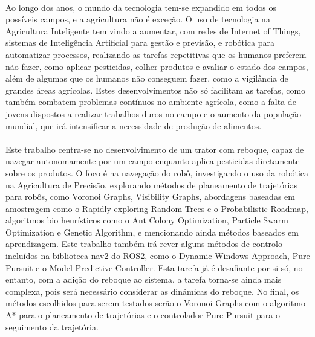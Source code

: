 
%

\paragraph{}Ao longo dos anos, o mundo da tecnologia tem-se expandido em todos os possíveis campos, 
e a agricultura não é exceção. O uso de tecnologia na Agricultura Inteligente tem vindo a aumentar, 
com redes de Internet of Things, sistemas de Inteligência Artificial para gestão e previsão, e robótica para 
automatizar processos, realizando as tarefas repetitivas que os humanos preferem não fazer, como 
aplicar pesticidas, colher produtos e avaliar o estado dos campos, além de algumas que os humanos 
não conseguem fazer, como a vigilância de grandes áreas agrícolas. Estes desenvolvimentos não só 
facilitam as tarefas, como também combatem problemas contínuos no ambiente agrícola, como a falta de 
jovens dispostos a realizar trabalhos duros no campo e o aumento da população mundial, que irá 
intensificar a necessidade de produção de alimentos.

\paragraph{}Este trabalho centra-se no desenvolvimento de um trator com reboque, capaz de navegar 
autonomamente por um campo enquanto aplica pesticidas diretamente sobre os produtos. 
O foco é na navegação do robô, investigando o uso da robótica na Agricultura de Precisão, 
explorando métodos de planeamento de trajetórias para robôs, como Voronoi Graphs, Visibility Graphs, 
abordagens baseadas em amostragem como o Rapidly exploring Random Trees e o Probabilistic Roadmap, algoritmos bio heurísticos como o Ant Colony Optimization, 
Particle Swarm Optimization e Genetic Algorithm, e mencionando ainda métodos baseados em aprendizagem. Este trabalho também irá rever alguns 
métodos de controlo incluídos na biblioteca nav2 do ROS2, como o Dynamic Windows Approach, Pure Pursuit e o Model Predictive Controller. Esta 
tarefa já é desafiante por si só, no entanto, com a adição do reboque ao sistema, a tarefa torna-se 
ainda mais complexa, pois será necessário considerar as dinâmicas do reboque. No final, os métodos 
escolhidos para serem testados serão o Voronoi Graphs com o algoritmo A* para o planeamento de 
trajetórias e o controlador Pure Pursuit para o seguimento da trajetória.


